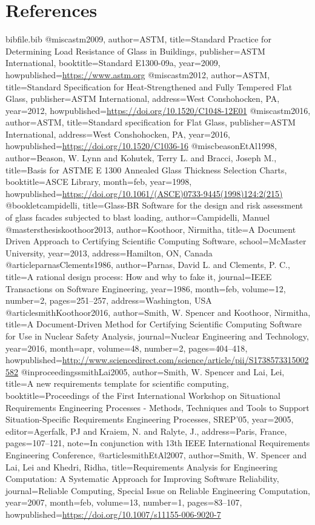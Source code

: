\documentclass[12pt]{article}
\begin{document}
\section{References}
\label{Sec:References}
\begin{filecontents*}{bibfile.bib}
@misc{astm2009,
author={ASTM},
title={Standard Practice for Determining Load Resistance of Glass in Buildings},
publisher={ASTM International},
booktitle={Standard E1300-09a},
year={2009},
howpublished={\url{https://www.astm.org}}}
@misc{astm2012,
author={ASTM},
title={Standard Specification for Heat-Strengthened and Fully Tempered Flat Glass},
publisher={ASTM International},
address={West Conshohocken, PA},
year={2012},
howpublished={\url{https://doi.org/10.1520/C1048-12E01}}}
@misc{astm2016,
author={ASTM},
title={Standard specification for Flat Glass},
publisher={ASTM International},
address={West Conshohocken, PA},
year={2016},
howpublished={\url{https://doi.org/10.1520/C1036-16}}}
@misc{beasonEtAl1998,
author={Beason, W. Lynn and Kohutek, Terry L. and Bracci, Joseph M.},
title={Basis for ASTME E 1300 Annealed Glass Thickness Selection Charts},
booktitle={ASCE Library},
month=feb,
year={1998},
howpublished={\url{https://doi.org/10.1061/(ASCE)0733-9445(1998)124:2(215)}}}
@booklet{campidelli,
title={Glass-BR Software for the design and risk assessment of glass facades subjected to blast loading},
author={Campidelli, Manuel}}
@mastersthesis{koothoor2013,
author={Koothoor, Nirmitha},
title={A Document Driven Approach to Certifying Scientific Computing Software},
school={McMaster University},
year={2013},
address={Hamilton, ON, Canada}}
@article{parnasClements1986,
author={Parnas, David L. and Clements, P. C.},
title={A rational design process: How and why to fake it},
journal={IEEE Transactions on Software Engineering},
year={1986},
month=feb,
volume={12},
number={2},
pages={251--257},
address={Washington, USA}}
@article{smithKoothoor2016,
author={Smith, W. Spencer and Koothoor, Nirmitha},
title={A Document-Driven Method for Certifying Scientific Computing Software for Use in Nuclear Safety Analysis},
journal={Nuclear Engineering and Technology},
year={2016},
month=apr,
volume={48},
number={2},
pages={404--418},
howpublished={\url{http://www.sciencedirect.com/science/article/pii/S1738573315002582}}}
@inproceedings{smithLai2005,
author={Smith, W. Spencer and Lai, Lei},
title={A new requirements template for scientific computing},
booktitle={Proceedings of the First International Workshop on Situational Requirements Engineering Processes - Methods, Techniques and Tools to Support Situation-Specific Requirements Engineering Processes, SREP'05},
year={2005},
editor={Agerfalk, PJ and Kraiem, N. and Ralyte, J.},
address={Paris, France},
pages={107--121},
note={In conjunction with 13th IEEE International Requirements Engineering Conference,}}
@article{smithEtAl2007,
author={Smith, W. Spencer and Lai, Lei and Khedri, Ridha},
title={Requirements Analysis for Engineering Computation: A Systematic Approach for Improving Software Reliability},
journal={Reliable Computing, Special Issue on Reliable Engineering Computation},
year={2007},
month=feb,
volume={13},
number={1},
pages={83--107},
howpublished={\url{https://doi.org/10.1007/s11155-006-9020-7}}}
\end{filecontents*}
\nocite{*}
\printbibliography[heading=none]
\end{document}
